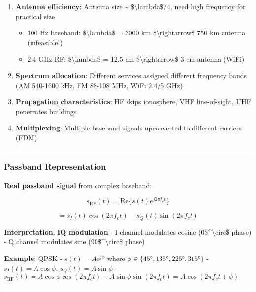\begin{enumerate}
\def\labelenumi{\arabic{enumi}.}
\item
  \textbf{Antenna efficiency}: Antenna size \textasciitilde{}
  \$\textbackslash lambda\$/4, need high frequency for practical size

  \begin{itemize}
  \tightlist
  \item
    100 Hz baseband: \$\textbackslash lambda\$ = 3000 km
    \$\textbackslash rightarrow\$ 750 km antenna (infeasible!)
  \item
    2.4 GHz RF: \$\textbackslash lambda\$ = 12.5 cm
    \$\textbackslash rightarrow\$ 3 cm antenna (WiFi)
  \end{itemize}
\item
  \textbf{Spectrum allocation}: Different services assigned different
  frequency bands (AM 540-1600 kHz, FM 88-108 MHz, WiFi 2.4/5 GHz)
\item
  \textbf{Propagation characteristics}: HF skips ionosphere, VHF
  line-of-sight, UHF penetrates buildings
\item
  \textbf{Multiplexing}: Multiple baseband signals upconverted to
  different carriers (FDM)
\end{enumerate}

\begin{center}\rule{0.5\linewidth}{0.5pt}\end{center}

\subsubsection{Passband Representation}\label{passband-representation}

\textbf{Real passband signal} from complex baseband:

\[
s_{\text{RF}}(t) = \text{Re}\{s(t) e^{j2\pi f_c t}\}
\]

\[
= s_I(t) \cos(2\pi f_c t) - s_Q(t) \sin(2\pi f_c t)
\]

\textbf{Interpretation}: \textbf{IQ modulation} - I channel modulates
cosine (0\$\^{}\textbackslash circ\$ phase) - Q channel modulates sine
(90\$\^{}\textbackslash circ\$ phase)

\textbf{Example}: QPSK - \(s(t) = A e^{j\phi}\) where
\(\phi \in \{45°, 135°, 225°, 315°\}\) - \(s_I(t) = A\cos\phi\),
\(s_Q(t) = A\sin\phi\) -
\(s_{\text{RF}}(t) = A\cos\phi \cos(2\pi f_c t) - A\sin\phi \sin(2\pi f_c t) = A\cos(2\pi f_c t + \phi)\)

\begin{center}\rule{0.5\linewidth}{0.5pt}\end{center}

